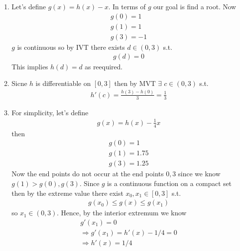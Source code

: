\begin{enumerate}[label=(\alph*)]
    \item 
    Let's define $g(x)=h(x)-x$. In terms of $g$ our 
    goal is find a root.
    Now 
    \begin{gather*}
        g(0)=1 \\
        g(1)=1 \\
        g(3) = -1
    \end{gather*}
    $g$ is continuous so by IVT there exists $d\in (0,3)$
    s.t. 
    \begin{align*}
        g(d)=0
    \end{align*}
    This implies $h(d)=d$ as reequired.

    \item
    Sicne $h$ is differentiable on $[0,3]$ then by MVT 
    $\exists$ $c\in (0,3)$ s.t. 
    \begin{align*}
        h'(c) = \frac{h(3)-h(0)}{3} = \frac{1}{3} 
    \end{align*}

    \item
    For simplicity, let's define 
    \begin{align*}
        g(x) = h(x) - \frac{1}{4}x
    \end{align*}
    then 
    \begin{gather*}
        g(0)=1 \\
        g(1)=1.75 \\
        g(3) = 1.25
    \end{gather*}
    Now the end points do not occur at the end points $0,3$
    since we know $g(1)>g(0),g(3)$. Since $g$ is a continuous 
    function on a compact set then by the extreme value \Thm
    there exist $x_0, x_1 \in [0,3]$ s.t. 
    \begin{align*}
        g(x_0) \leq g(x) \leq g(x_1)
    \end{align*}
    so $x_1 \in (0,3)$. Hence, by the interior extremum \Thm 
    we know 
    \begin{gather*}
        g'(x_1) = 0 \\
        \Rightarrow g'(x_1) = h'(x) - 1/4 = 0 \\
        \Rightarrow h'(x) = 1/4
    \end{gather*}
\end{enumerate}

